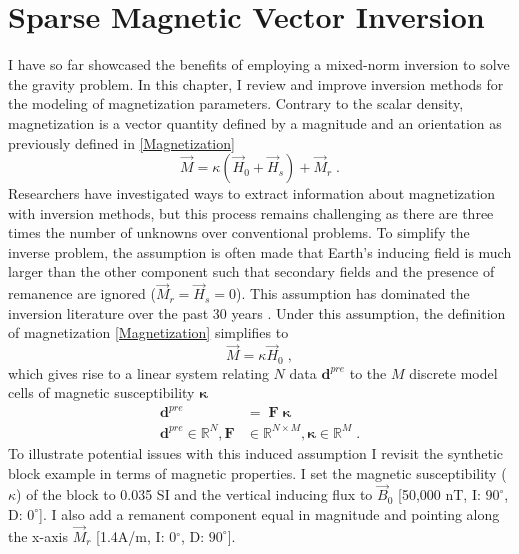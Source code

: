 \graphicspath{{./../Figures/}}
\chapter{Sparse Magnetic Vector Inversion}
\label{Chapter4}

I have so far showcased the benefits of employing a mixed-norm inversion to solve the gravity problem. In this chapter, I review and improve inversion methods for the modeling of magnetization parameters. Contrary to the scalar density, magnetization is a vector quantity defined by a magnitude and an orientation as previously defined in \eqref{Magnetization}
\begin{equation}
	\vec{M} = \kappa (\vec{H}_0 + \vec{H}_s) + \vec{M}_{r}\;.
\end{equation}
Researchers have investigated ways to extract information about magnetization with inversion methods, but this process remains challenging as there are three times the number of unknowns over conventional problems.
To simplify the inverse problem, the assumption is often made that Earth’s inducing field is much larger than the other component such that secondary fields and the presence of remanence are ignored ($\vec{M}_{r}=\vec{H}_s=0$). This assumption has dominated the inversion literature over the past 30 years \cite[]{LiOldenburg1996, Pilkington97}.
Under this assumption, the definition of magnetization \eqref{Magnetization} simplifies to
\begin{equation*}\label{Fwr_Susc}
\vec{M}= \kappa \vec{H}_0\;,
\end{equation*}
which gives rise to a linear system relating $N$ data $\mathbf{d}^{pre}$ to the $M$ discrete model cells of magnetic susceptibility $\boldsymbol \kappa$
\begin{equation}\label{datatmi}
\begin{split}
	\mathbf{d}^{pre}&= \;\mathbf{F\;\boldsymbol{\kappa}} \\
\mathbf{d}^{pre} \in \mathbb{R}^{N},\mathbf{F}& \in \mathbb{R}^{N \times M}, \boldsymbol{\kappa} \in \mathbb{R}^{M}\;.
\end{split}
\end{equation}
To illustrate potential issues with this induced assumption I revisit the synthetic block example in terms of magnetic properties. I set the magnetic susceptibility ($\kappa$) of the block to 0.035 SI and the vertical inducing flux to $\vec{B}_0$ [50,000 nT, I: $90^\circ$, D: $0^\circ$]. I also add a remanent component equal in magnitude and pointing along the x-axis $\vec{M}_r$ [1.4\:A/m, I: 0$^\circ$, D: $90^\circ$].
